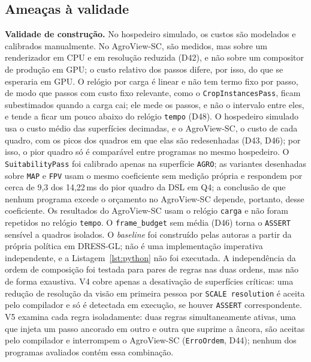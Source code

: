 \documentclass[conference]{IEEEtran}
\begin{document}
\subsection{Ameaças à validade}
\label{sec:ameacas}

\textbf{Validade de construção.} No hospedeiro simulado, os custos são
modelados e calibrados manualmente. No AgroView-SC, são medidos, mas sobre um
renderizador em CPU e em resolução reduzida (D42), e não sobre um compositor de
produção em GPU; o custo relativo dos passos difere, por isso, do que se
esperaria em GPU. O relógio por carga é linear e não tem termo fixo por passo,
de modo que passos com custo fixo relevante, como o
\texttt{CropInstancesPass}, ficam subestimados quando a carga cai; ele mede os
passos, e não o intervalo entre eles, e tende a ficar um pouco abaixo do
relógio \texttt{tempo} (D48). O hospedeiro simulado usa o custo médio das
superfícies decimadas, e o AgroView-SC, o custo de cada quadro, com os picos
dos quadros em que elas são redesenhadas (D43, D46); por isso, o pior quadro
só é comparável entre programas no mesmo hospedeiro. O \texttt{SuitabilityPass} foi calibrado apenas
na superfície \texttt{AGRO}; as variantes desenhadas sobre \texttt{MAP} e
\texttt{FPV} usam o mesmo coeficiente sem medição própria e respondem por cerca
de 9,3 dos 14,22\,ms do pior quadro da DSL em Q4; a conclusão de que nenhum
programa excede o orçamento no AgroView-SC depende, portanto, desse
coeficiente. Os resultados do
AgroView-SC usam o relógio \texttt{carga} e não foram repetidos no relógio
\texttt{tempo}. O \texttt{frame\_budget} sem média (D46) torna o
\texttt{ASSERT} sensível a quadros isolados. O \textit{baseline} foi construído
pelas autoras a partir da própria política em DRESS-GL; não é uma
implementação imperativa independente, e a Listagem~\ref{lst:python} não foi
executada. A independência da ordem de composição foi testada para pares de
regras nas duas ordens, mas não de forma exaustiva. V4 cobre apenas a
desativação de superfícies críticas: uma redução de resolução da visão em
primeira pessoa por \texttt{SCALE resolution} é aceita pelo compilador e só é
detectada em execução, se houver \texttt{ASSERT} correspondente. V5 examina
cada regra isoladamente: duas regras simultaneamente ativas, uma que injeta um
passo ancorado em outro e outra que suprime a âncora, são aceitas pelo
compilador e interrompem o AgroView-SC (\texttt{ErroOrdem}, D44); nenhum dos
programas avaliados contém essa combinação.
\end{document}

